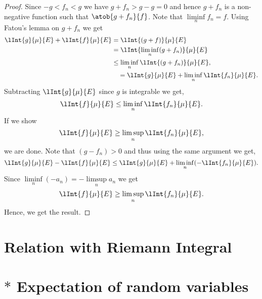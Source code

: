 \begin{proof}
    Since $-g < f_n < g$ we have $g + f_n > g - g = 0$ and hence $g + f_n$ is a non-negative function such
    that $\atob{g+f_n}{f}$. Note that $\liminf\limits_n f_n = f$. Using
    Fatou's lemma on $g + f_n$ we get
    \begin{align*}
	\lInt{g}{\mu}{E} + \lInt{f}{\mu}{E} &= \lInt{(g+f)}{\mu}{E} \\
	&= \lInt{\liminf\limits_{n}(g+f_n)}{\mu}{E} \\
	&\leq \liminf\limits_{n}\lInt{(g+f_n)}{\mu}{E},\\
	&\quad = \lInt{g}{\mu}{E} + \liminf\limits_n\lInt{f_n}{\mu}{E}.
    \end{align*}
    Subtracting $\lInt{g}{\mu}{E}$ since $g$ is integrable we get,
    \[\lInt{f}{\mu}{E} \leq \liminf\limits_n\lInt{f_n}{\mu}{E}.\]
    If we show 
    \[\lInt{f}{\mu}{E} \geq \limsup\limits_n\lInt{f_n}{\mu}{E},\]
    we are done. Note that $(g-f_n) > 0$ and thus using the same argument we get,
    \[\lInt{g}{\mu}{E} - \lInt{f}{\mu}{E} \leq \lInt{g}{\mu}{E} + \liminf\limits_{n}(-\lInt{f_n}{\mu}{E}).\] 
    Since $\liminf\limits_{n}(-a_n) = -\limsup\limits_{n}a_n$ we get
    \[\lInt{f}{\mu}{E} \geq \limsup\limits_{n}\lInt{f_n}{\mu}{E}.\]
    Hence, we get the result.
\end{proof}


\section{Relation with Riemann Integral}
\section{{$\ast$} Expectation of random variables}


